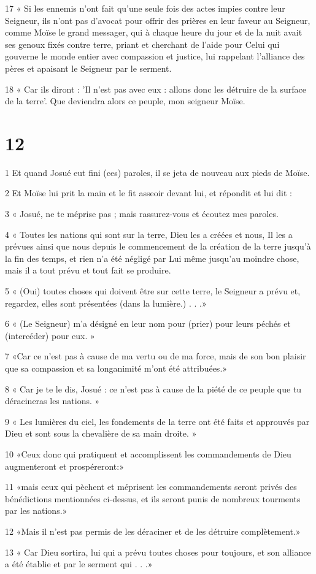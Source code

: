 \par 17 « Si les ennemis n'ont fait qu'une seule fois des actes impies contre leur Seigneur, ils n'ont pas d'avocat pour offrir des prières en leur faveur au Seigneur, comme Moïse le grand messager, qui à chaque heure du jour et de la nuit avait ses genoux fixés contre terre, priant et cherchant de l'aide pour Celui qui gouverne le monde entier avec compassion et justice, lui rappelant l'alliance des pères et apaisant le Seigneur par le serment.
\par 18 « Car ils diront : 'Il n'est pas avec eux : allons donc les détruire de la surface de la terre'. Que deviendra alors ce peuple, mon seigneur Moïse.

\chapter{12}

\par 1 Et quand Josué eut fini (ces) paroles, il se jeta de nouveau aux pieds de Moïse.
\par 2 Et Moïse lui prit la main et le fit asseoir devant lui, et répondit et lui dit :
\par 3 « Josué, ne te méprise pas ; mais rassurez-vous et écoutez mes paroles.
\par 4 « Toutes les nations qui sont sur la terre, Dieu les a créées et nous, Il les a prévues ainsi que nous depuis le commencement de la création de la terre jusqu'à la fin des temps, et rien n'a été négligé par Lui même jusqu'au moindre chose, mais il a tout prévu et tout fait se produire.
\par 5 « (Oui) toutes choses qui doivent être sur cette terre, le Seigneur a prévu et, regardez, elles sont présentées (dans la lumière.) . . .»
\par 6 « (Le Seigneur) m'a désigné en leur nom pour (prier) pour leurs péchés et (intercéder) pour eux. »
\par 7 «Car ce n'est pas à cause de ma vertu ou de ma force, mais de son bon plaisir que sa compassion et sa longanimité m'ont été attribuées.»
\par 8 « Car je te le dis, Josué : ce n’est pas à cause de la piété de ce peuple que tu déracineras les nations. »
\par 9 « Les lumières du ciel, les fondements de la terre ont été faits et approuvés par Dieu et sont sous la chevalière de sa main droite. »
\par 10 «Ceux donc qui pratiquent et accomplissent les commandements de Dieu augmenteront et prospéreront:»
\par 11 «mais ceux qui pèchent et méprisent les commandements seront privés des bénédictions mentionnées ci-dessus, et ils seront punis de nombreux tourments par les nations.»
\par 12 «Mais il n'est pas permis de les déraciner et de les détruire complètement.»
\par 13 « Car Dieu sortira, lui qui a prévu toutes choses pour toujours, et son alliance a été établie et par le serment qui . . .»

